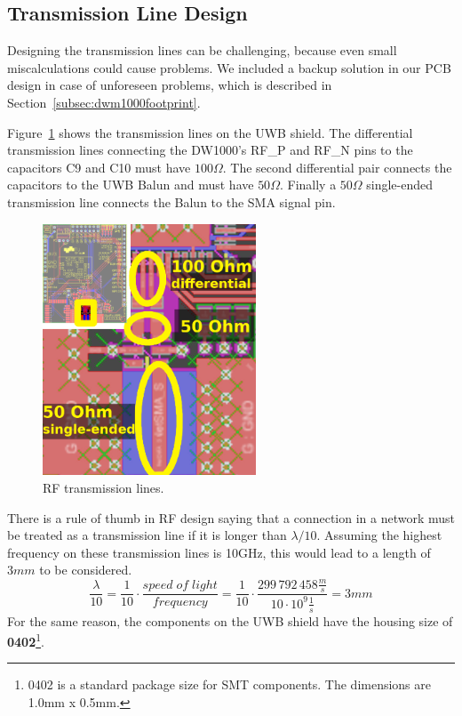 \documentclass[journal,comsoc]{IEEEtran}
\begin{document}
\subsection{Transmission Line Design}
\label{subsec:txlinedesign}
Designing the transmission lines can be challenging, because even small miscalculations could cause problems. 
We included a backup solution in our PCB design in case of unforeseen problems, which is described in Section~\ref{subsec:dwm1000footprint}.

Figure~\ref{fig:txlines} shows the transmission lines on the UWB shield.
The differential transmission lines connecting the DW1000's RF\_P and RF\_N pins to the capacitors C9 and C10 must have $100\Omega$.
The second differential pair connects the capacitors to the UWB Balun and must have $50\Omega$.
Finally a $50\Omega$ single-ended transmission line connects the Balun to the SMA signal pin.
\begin{figure}%
	\centering
	\includegraphics[width=2.5in]{Figures/txlines}
	\caption{RF transmission lines.}
	\label{fig:txlines}
\end{figure}
There is a rule of thumb in RF design saying that a connection in a network must be treated as a transmission line if it is longer than $\lambda / 10$.
Assuming the highest frequency on these transmission lines is 10GHz, this would lead to a length of $3mm$ to be considered.
\begin{equation}
\label{eq:lambda10}
\frac{\lambda}{10} = \frac{1}{10} \cdot \frac{speed\;of\;light}{frequency} = \frac{1}{10} \cdot \frac{299\,792\,458 \frac{m}{s}}{10\cdot 10^9 \frac{1}{s}} = 3mm
\end{equation}
For the same reason, the components on the UWB shield have the housing size of \textbf{0402}\footnote{0402 is a standard package size for SMT components. The dimensions are 1.0mm x 0.5mm.}. 
\end{document}
